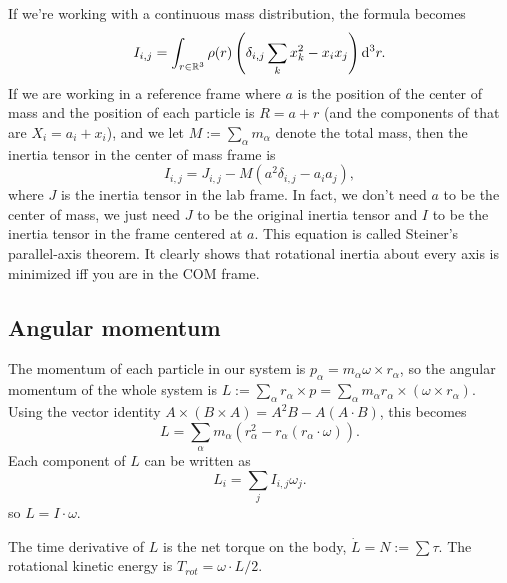 \documentclass{article}
\begin{document}
\par
If we're working with a continuous mass distribution, the formula becomes
\[ I_{i,j} = \int_{r \in \mathbb{R}^3} \rho(r) \left( \delta_{i,j} \sum_k x_k^2 - x_i x_j \right) \mathrm{d}^3r. \]
If we are working in a reference frame where $a$ is the position of the center of mass and the position of each particle is $R=a+r$ (and the components of that are $X_i=a_i+x_i$), and we let $M:= \sum_\alpha m_\alpha$ denote the total mass, then the inertia tensor in the center of mass frame is
\[ I_{i,j} = J_{i,j} - M \left( a^2 \delta_{i,j} - a_i a_j \right), \]
where $J$ is the inertia tensor in the lab frame. In fact, we don't need $a$ to be the center of mass, we just need $J$ to be the original inertia tensor and $I$ to be the inertia tensor in the frame centered at $a$. This equation is called Steiner's parallel-axis theorem. It clearly shows that rotational inertia about every axis is minimized iff you are in the COM frame.

\subsection{Angular momentum}
The momentum of each particle in our system is $p_\alpha = m_\alpha \omega \times r_\alpha$, so the angular momentum of the whole system is $L := \sum_\alpha r_\alpha \times p = \sum_\alpha m_\alpha r_\alpha \times (\omega \times r_\alpha)$. Using the vector identity $A \times (B \times A) = A^2B-A(A\cdot B)$, this becomes
\[ L = \sum_\alpha m_\alpha \left( r_\alpha^2 - r_\alpha (r_\alpha \cdot \omega) \right). \]
Each component of $L$ can be written as
\[ L_i = \sum_j I_{i,j} \omega_j. \]
so $L = I \cdot \omega$.
\par
The time derivative of $L$ is the net torque on the body, $\dot{L} = N := \sum \tau$. The rotational kinetic energy is $T_{rot} = \omega \cdot L / 2$.
\end{document}
